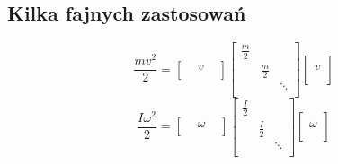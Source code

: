 \documentclass[../main.tex]{subfiles}
\begin{document}
\subsection{Kilka fajnych zastosowań}
\[
    \frac{mv^2}{2} =
\left [ \begin{matrix}
 &v &\\ \end{matrix}\right ]
\left [ \begin{matrix}
    \frac{m}{2}\\
&\frac{m}{2}\\
   & & \ddots\\
    \end{matrix}\right ]  \left [ \begin{matrix}
\\
v\\
 \\\end{matrix}\right ]
\]
\[
    \frac{I \omega^2}{2} =
    \left [ \begin{matrix}
    &\omega &
    \\ \end{matrix}\right ]
    \left [ \begin{matrix}
    \frac{I}{2} & &\\
     &\frac{I}{2} &\\
     & &\ddots\\
     \end{matrix}\right ] \left [ \begin{matrix}
    \\
    \omega\\
    \\
    \end{matrix}\right ]
\]
\end{document}
